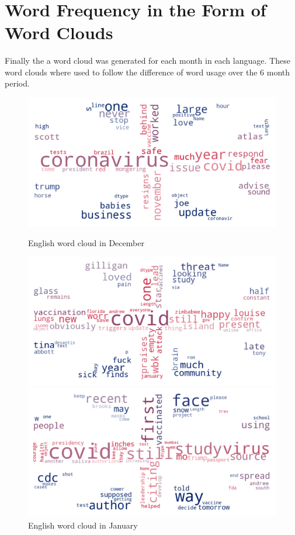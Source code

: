 \begin{landscape}
\newpage~\newpage~\newpage~\newpage~\newpage~\newpage

\section{Word Frequency in the Form of Word Clouds}

Finally the a word cloud was generated for each month in each language.
These word clouds where used to follow the difference of word usage over the 6 month period.

\newpage

\begin{figure}[!htb]
  \includegraphics[width=\linewidth]{December en word cloud.png}
  \caption{English word cloud in December}\label{fig:decemberUK}
\endminipage\hfill
{}
  \includegraphics[width=\linewidth]{January en word cloud.png}
  \caption{English word cloud in January}\label{fig:januaryUK}
\endminipage\hfill
{}
  \includegraphics[width=\linewidth]{February en word cloud.png}

\end{figure}
\end{landscape}
